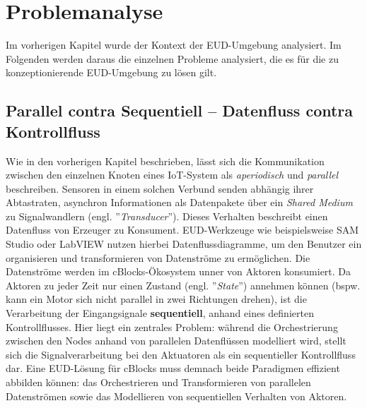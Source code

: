\section{Problemanalyse}\label{sec:problemanalyse}
Im vorherigen Kapitel wurde der Kontext der \ac{EUD}-Umgebung analysiert. Im Folgenden werden daraus die einzelnen Probleme analysiert, die es für die zu konzeptionierende \ac{EUD}-Umgebung zu lösen gilt.

\subsection{Parallel contra Sequentiell -- Datenfluss contra Kontrollfluss}
Wie in den vorherigen Kapitel beschrieben, lässt sich die Kommunikation zwischen den einzelnen Knoten eines \ac{IoT}-System als \textit{aperiodisch} und \textit{parallel} beschreiben. Sensoren in einem solchen Verbund senden abhängig ihrer Abtastraten, asynchron Informationen als Datenpakete über ein \textit{Shared Medium} zu Signalwandlern (engl. ''\textit{Transducer}''). Dieses Verhalten beschreibt einen Datenfluss von Erzeuger zu Konsument. \ac{EUD}-Werkzeuge wie beispielsweise SAM Studio oder LabVIEW nutzen hierbei Datenflussdiagramme, um den Benutzer ein organisieren und transformieren von Datenströme zu ermöglichen. Die Datenströme werden im \acp{cBlock}-Ökosystem unner von Aktoren konsumiert. Da Aktoren zu jeder Zeit nur einen Zustand (engl. ''\textit{State}'') annehmen können (bspw. kann ein Motor sich nicht parallel in zwei Richtungen drehen), ist die Verarbeitung der Eingangsignale \textbf{sequentiell}, anhand eines definierten Kontrollflusses. Hier liegt ein zentrales Problem: während die Orchestrierung zwischen den Nodes anhand von parallelen Datenflüssen modelliert wird, stellt sich die Signalverarbeitung bei den Aktuatoren als ein sequentieller Kontrollfluss dar. Eine \ac{EUD}-Lösung für cBlocks muss demnach beide Paradigmen effizient abbilden können: das Orchestrieren und Transformieren von parallelen Datenströmen sowie das Modellieren von sequentiellen Verhalten von Aktoren.

